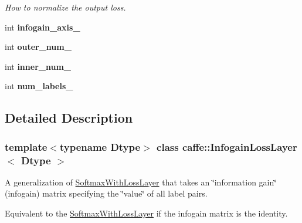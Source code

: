 \begin{DoxyCompactItemize}
\begin{DoxyCompactList}\small\item\em How to normalize the output loss. \end{DoxyCompactList}\item 
\mbox{\label{classcaffe_1_1_infogain_loss_layer_a0f94b595bd8be01b31994236af8cecbd}} 
int {\bfseries infogain\+\_\+axis\+\_\+}
\item 
\mbox{\label{classcaffe_1_1_infogain_loss_layer_aaf878e99cf00ac309ed533adf43bcbc3}} 
int {\bfseries outer\+\_\+num\+\_\+}
\item 
\mbox{\label{classcaffe_1_1_infogain_loss_layer_a6707b103411c0acc3fddd065e91fe6e0}} 
int {\bfseries inner\+\_\+num\+\_\+}
\item 
\mbox{\label{classcaffe_1_1_infogain_loss_layer_a8b58f39c561263cfa44c3831e6a15355}} 
int {\bfseries num\+\_\+labels\+\_\+}
\end{DoxyCompactItemize}


\subsection{Detailed Description}
\subsubsection*{template$<$typename Dtype$>$\newline
class caffe\+::\+Infogain\+Loss\+Layer$<$ Dtype $>$}

A generalization of \mbox{\hyperlink{classcaffe_1_1_softmax_with_loss_layer}{Softmax\+With\+Loss\+Layer}} that takes an \char`\"{}information gain\char`\"{} (infogain) matrix specifying the \char`\"{}value\char`\"{} of all label pairs. 

Equivalent to the \mbox{\hyperlink{classcaffe_1_1_softmax_with_loss_layer}{Softmax\+With\+Loss\+Layer}} if the infogain matrix is the identity.



